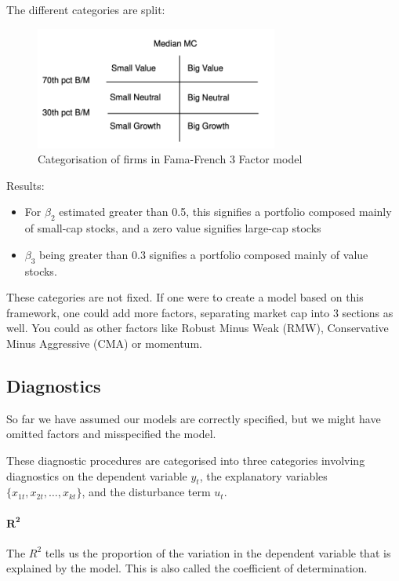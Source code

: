\documentclass[11pt]{article}
\begin{document}
The different categories are split:
\begin{figure}[h]
    \centering
    \includegraphics[width=8cm]{pics/ff3.png}
    \caption{Categorisation of firms in Fama-French 3 Factor model}
    \label{fig:ff3}
\end{figure}



\begin{mdframed}
    Results:
    \begin{itemize}
        \item For $\beta_2$ estimated greater than 0.5, this signifies a portfolio composed mainly of small-cap stocks, and a zero value signifies large-cap stocks
        \item $\beta_3$ being greater than 0.3 signifies a portfolio composed mainly of value stocks.
    \end{itemize}
\end{mdframed}
These categories are not fixed. If one were to create a model based on this framework, one could add more factors, separating market cap into 3 sections as well. You could as other factors like Robust Minus Weak (RMW), Conservative Minus Aggressive (CMA) or momentum.

\subsection{Diagnostics}

So far we have assumed our models are correctly specified, but we might have omitted factors and misspecified the model.

These diagnostic procedures are categorised into three categories involving diagnostics on the dependent variable $y_t$, the explanatory variables $\{x_{1t}, x_{2t},\ldots, x_{kt}\}$, and the disturbance term $u_t$.

\paragraph{$\boldsymbol{R^2}$} \mbox{}


The $R^2$ tells us the proportion of the variation in the dependent variable that is explained by the model. This is also called the coefficient of determination.
\end{document}
